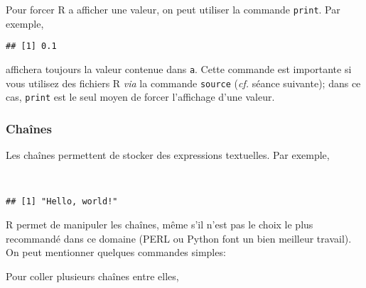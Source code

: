 Pour forcer R a afficher une valeur, on peut utiliser la commande \texttt{print}. Par exemple,

\begin{knitrout}
\color{fgcolor}\begin{kframe}
\begin{flushleft}
\ttfamily\noindent
{}\hlkeyword{(}\hlkeyword{)}\mbox{}
\normalfont
\end{flushleft}
\begin{verbatim}
## [1] 0.1
\end{verbatim}
\end{kframe}
\end{knitrout}


\noindent affichera toujours la valeur contenue dans \texttt{a}.
Cette commande est importante si vous utilisez des fichiers R \emph{via} la commande \texttt{source} (\emph{cf.} séance suivante);
dans ce cas, \texttt{print} est le seul moyen de forcer l'affichage d'une valeur.

\subsubsection{Chaînes}

Les chaînes permettent de stocker des expressions textuelles.
Par exemple,

\begin{knitrout}
\color{fgcolor}\begin{kframe}
\begin{flushleft}
\ttfamily\noindent
{}\hlassignement{\usebox{\hlnormalsizeboxlessthan}-}{\ }\hspace*{\fill}\\
\hlstd{}\mbox{}
\normalfont
\end{flushleft}
\begin{verbatim}
## [1] "Hello, world!"
\end{verbatim}
\end{kframe}
\end{knitrout}


R permet de manipuler les chaînes, même s'il n'est pas le choix le plus recommandé dans ce domaine (PERL ou Python font un bien meilleur travail).
On peut mentionner quelques commandes simples:

Pour coller plusieurs chaînes entre elles,

